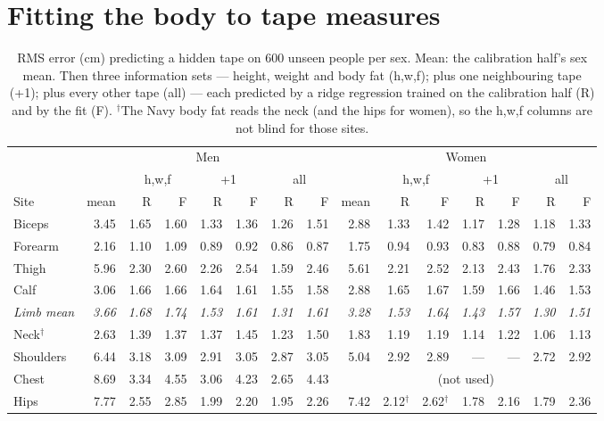 \documentclass[10pt,twocolumn]{article}
\begin{document}
\section{Fitting the body to tape measures}\label{sec:fit}

\begin{table}[t]
\centering\footnotesize
\setlength{\tabcolsep}{3.6pt}
\caption{RMS error (cm) predicting a hidden tape on 600 unseen people per sex. Mean: the
calibration half's sex mean. Then three information sets --- height, weight and body fat (h,w,f);
plus one neighbouring tape (+1); plus every other tape (all) --- each predicted by a ridge regression
trained on the calibration half (R) and by the fit (F). $^\dagger$The Navy body fat reads the neck
(and the hips for women), so the h,w,f columns are not blind for those sites.}
\label{tab:holdout}
\begin{tabular}{@{}lrrrrrrr@{\hspace{14pt}}rrrrrrr@{}}
\toprule
 & \multicolumn{7}{c}{Men} & \multicolumn{7}{c}{Women}\\
\cmidrule(lr){2-8}\cmidrule(l){9-15}
 & & \multicolumn{2}{c}{h,w,f} & \multicolumn{2}{c}{+1} & \multicolumn{2}{c}{all}
 & & \multicolumn{2}{c}{h,w,f} & \multicolumn{2}{c}{+1} & \multicolumn{2}{c}{all}\\
\cmidrule(lr){3-4}\cmidrule(lr){5-6}\cmidrule(lr){7-8}\cmidrule(lr){10-11}\cmidrule(lr){12-13}\cmidrule(l){14-15}
Site & mean & R & F & R & F & R & F & mean & R & F & R & F & R & F\\
\midrule
Biceps   & 3.45 & 1.65 & 1.60 & 1.33 & 1.36 & 1.26 & 1.51 & 2.88 & 1.33 & 1.42 & 1.17 & 1.28 & 1.18 & 1.33\\
Forearm  & 2.16 & 1.10 & 1.09 & 0.89 & 0.92 & 0.86 & 0.87 & 1.75 & 0.94 & 0.93 & 0.83 & 0.88 & 0.79 & 0.84\\
Thigh    & 5.96 & 2.30 & 2.60 & 2.26 & 2.54 & 1.59 & 2.46 & 5.61 & 2.21 & 2.52 & 2.13 & 2.43 & 1.76 & 2.33\\
Calf     & 3.06 & 1.66 & 1.66 & 1.64 & 1.61 & 1.55 & 1.58 & 2.88 & 1.65 & 1.67 & 1.59 & 1.66 & 1.46 & 1.53\\
\textit{Limb mean} & \textit{3.66} & \textit{1.68} & \textit{1.74} & \textit{1.53} & \textit{1.61} & \textit{1.31} & \textit{1.61}
 & \textit{3.28} & \textit{1.53} & \textit{1.64} & \textit{1.43} & \textit{1.57} & \textit{1.30} & \textit{1.51}\\
Neck$^\dagger$ & 2.63 & 1.39 & 1.37 & 1.37 & 1.45 & 1.23 & 1.50 & 1.83 & 1.19 & 1.19 & 1.14 & 1.22 & 1.06 & 1.13\\
Shoulders & 6.44 & 3.18 & 3.09 & 2.91 & 3.05 & 2.87 & 3.05 & 5.04 & 2.92 & 2.89 & --- & --- & 2.72 & 2.92\\
Chest    & 8.69 & 3.34 & 4.55 & 3.06 & 4.23 & 2.65 & 4.43 & \multicolumn{7}{c}{(not used)}\\
Hips     & 7.77 & 2.55 & 2.85 & 1.99 & 2.20 & 1.95 & 2.26 & 7.42 & 2.12$^\dagger$ & 2.62$^\dagger$ & 1.78 & 2.16 & 1.79 & 2.36\\
\bottomrule
\end{tabular}
\end{table}
\end{document}
